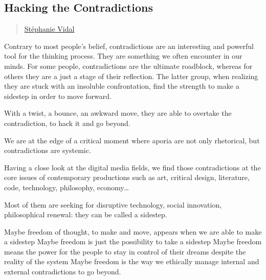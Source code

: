 \subsection{Hacking the
Contradictions}\label{hacking-the-contradictions}

\begin{quote}
\hyperlink{stephanie-vidal}{Stéphanie Vidal}
\end{quote}

Contrary to most people's belief, contradictions are an interesting and
powerful tool for the thinking process. They are something we often
encounter in our minds. For some people, contradictions are the ultimate
roadblock, whereas for others they are a just a stage of their
reflection. The latter group, when realizing they are stuck with an
insoluble confrontation, find the strength to make a sidestep in order
to move forward.

With a twist, a bounce, an awkward move, they are able to overtake the
contradiction, to hack it and go beyond.

We are at the edge of a critical moment where aporia are not only
rhetorical, but contradictions are systemic.

Having a close look at the digital media fields, we find those
contradictions at the core issues of contemporary productions such as
art, critical design, literature, code, technology, philosophy,
economy\ldots{}

Most of them are seeking for disruptive technology, social innovation,
philosophical renewal: they can be called a sidestep.

Maybe freedom of thought, to make and move, appears when we are able to
make a sidestep Maybe freedom is just the possibility to take a sidestep
Maybe freedom means the power for the people to stay in control of their
dreams despite the reality of the system Maybe freedom is the way we
ethically manage internal and external contradictions to go beyond.
